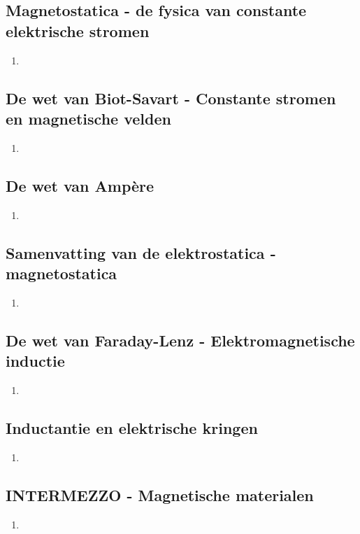 \documentclass[12pt]{article}
\begin{document}
    \subsection{Magnetostatica - de fysica van constante elektrische stromen}
    \begin{enumerate}
        \item 
    \end{enumerate}
    \subsection{De wet van Biot-Savart - Constante stromen en magnetische velden}
    \begin{enumerate}
        \item 
    \end{enumerate}
    \subsection{De wet van Ampère}
    \begin{enumerate}
        \item 
    \end{enumerate}
    \subsection{Samenvatting van de elektrostatica - magnetostatica}
    \begin{enumerate}
        \item 
    \end{enumerate}
    \subsection{De wet van Faraday-Lenz - Elektromagnetische inductie}
    \begin{enumerate}
        \item 
    \end{enumerate}
    \subsection{Inductantie en elektrische kringen}
    \begin{enumerate}
        \item 
    \end{enumerate}
    \subsection{INTERMEZZO - Magnetische materialen}
    \begin{enumerate}
        \item 
    \end{enumerate}
\end{document}

